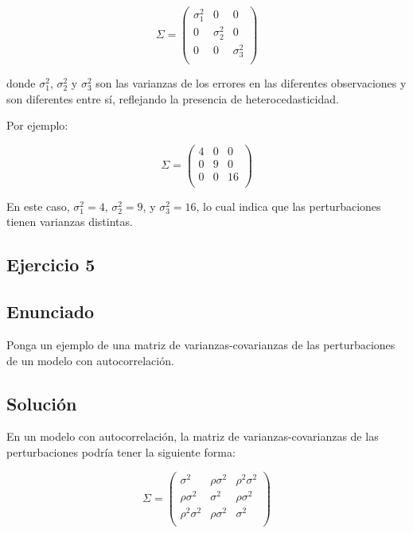 \documentclass[a4paper,12pt]{article}
\begin{document}
\[
\Sigma = \begin{pmatrix}
\sigma_1^2 & 0 & 0 \\
0 & \sigma_2^2 & 0 \\
0 & 0 & \sigma_3^2 \\
\end{pmatrix}
\]



donde \(\sigma_1^2\), \(\sigma_2^2\) y \(\sigma_3^2\) son las varianzas de los errores en las diferentes observaciones y son diferentes entre sí, reflejando la presencia de heterocedasticidad.

Por ejemplo:



\[
\Sigma = \begin{pmatrix}
4 & 0 & 0 \\
0 & 9 & 0 \\
0 & 0 & 16 \\
\end{pmatrix}
\]



En este caso, \(\sigma_1^2 = 4\), \(\sigma_2^2 = 9\), y \(\sigma_3^2 = 16\), lo cual indica que las perturbaciones tienen varianzas distintas.

\subsection{Ejercicio 5}
\subsection*{Enunciado}
Ponga un ejemplo de una matriz de varianzas-covarianzas de las perturbaciones de un modelo con autocorrelación.

\subsection*{Solución}
En un modelo con autocorrelación, la matriz de varianzas-covarianzas de las perturbaciones podría tener la siguiente forma:



\[
\Sigma = \begin{pmatrix}
\sigma^2 & \rho \sigma^2 & \rho^2 \sigma^2 \\
\rho \sigma^2 & \sigma^2 & \rho \sigma^2 \\
\rho^2 \sigma^2 & \rho \sigma^2 & \sigma^2 \\
\end{pmatrix}
\]
\end{document}
